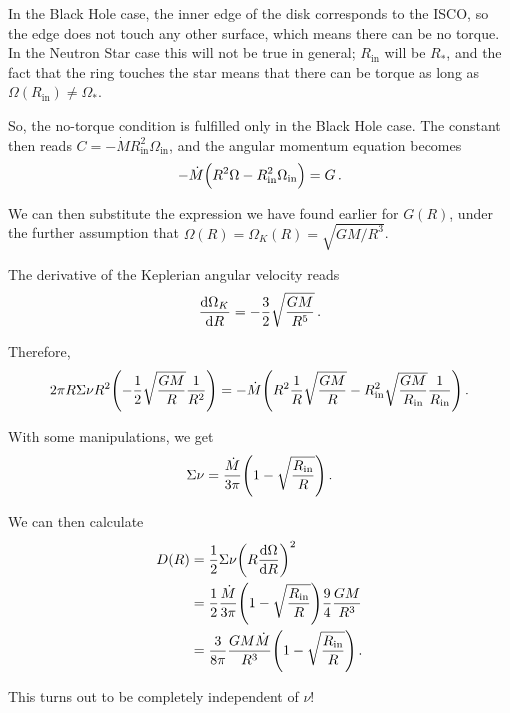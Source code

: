 \documentclass[main.tex]{subfiles}
\begin{document}
In the Black Hole case, the inner edge of the disk corresponds to the ISCO, so the edge does not touch any other surface, which means there can be no torque. 
In the Neutron Star case this will not be true in general; \(R _{\text{in}}\) will be \(R_{*}\), and the fact that the ring touches the star means that there can be torque as long as \(\Omega (R _{\text{in}}) \neq \Omega _*\). 

So, the no-torque condition is fulfilled only in the Black Hole case. 
The constant then reads \(C = -\dot{M} R^2 _{\text{in}} \Omega _{\text{in}}\), and the angular momentum equation becomes 
%
\begin{align}
-\dot{M} \qty(R^2 \Omega - R^2 _{\text{in}} \Omega _{\text{in}}) = G
\,.
\end{align}

We can then substitute the expression we have found earlier for \(G(R)\), under the further assumption that \(\Omega (R) = \Omega _K (R )= \sqrt{GM / R^3}\). 

The derivative of the Keplerian angular velocity reads 
%
\begin{align}
\dv{\Omega _K}{R} = - \frac{3}{2} \sqrt{ \frac{GM}{R^5}}
\,.
\end{align}

Therefore, 
%
\begin{align}
2 \pi R \Sigma \nu R^2 \qty(- \frac{1}{2} \sqrt{ \frac{GM}{R}} \frac{1}{R^2}) = - \dot{M} \qty(R^2 \frac{1}{R} \sqrt{ \frac{GM}{R}}- R^2 _{\text{in}} \sqrt{ \frac{GM}{R _{\text{in}}}} \frac{1}{R _{\text{in}}})
\,.
\end{align}

With some manipulations, we get 
%
\begin{align}
\Sigma \nu = \frac{\dot{M}}{3 \pi } \qty(1 - \sqrt{\frac{R _{\text{in}}}{R}})
\,.
\end{align}

We can then calculate 
%
\begin{align}
D(R) &= \frac{1}{2} \Sigma \nu \qty(R \dv{\Omega }{R})^2  \\
&= \frac{1}{2} \frac{\dot{M}}{3 \pi } \qty(1 - \sqrt{\frac{R _{\text{in}}}{R}}) \frac{9}{4} \frac{GM}{R^3}  \\
&= \frac{3}{8 \pi } \frac{G M \dot{M}}{R^3} \qty(1 - \sqrt{ \frac{R _{\text{in}}}{R}})
\,.
\end{align}

This turns out to be completely independent of \(\nu \)! 
\end{document}
